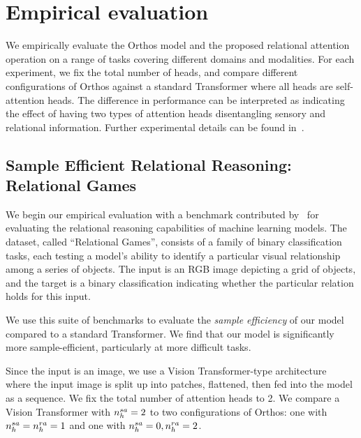 \section{Empirical evaluation}\label{sec:experiments}

We empirically evaluate the Orthos model and the proposed relational attention operation on a range of tasks covering different domains and modalities. For each experiment, we fix the total number of heads, and compare different configurations of Orthos against a standard Transformer where all heads are self-attention heads. The difference in performance can be interpreted as indicating the effect of having two types of attention heads disentangling sensory and relational information. Further experimental details can be found in~.

\subsection{Sample Efficient Relational Reasoning: Relational Games}\label{ssec:relgames}

We begin our empirical evaluation with a benchmark contributed by~\citet{shanahanExplicitlyRelationalNeurala} for evaluating the relational reasoning capabilities of machine learning models. The dataset, called ``Relational Games'', consists of a family of binary classification tasks, each testing a model's ability to identify a particular visual relationship among a series of objects. The input is an RGB image depicting a grid of objects, and the target is a binary classification indicating whether the particular relation holds for this input.

We use this suite of benchmarks to evaluate the \textit{sample efficiency} of our model compared to a standard Transformer. We find that our model is significantly more sample-efficient, particularly at more difficult tasks. %

Since the input is an image, we use a Vision Transformer-type architecture~\citep{dosovitskiyImageWorth16x162020} where the input image is split up into patches, flattened, then fed into the model as a sequence. We fix the total number of attention heads to 2. We compare a Vision Transformer with $n_h^{sa} = 2$ to two configurations of Orthos: one with $n_h^{sa} =  n_h^{ra} = 1$ and one with $n_h^{sa} = 0, n_h^{ra} = 2$.


